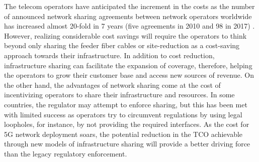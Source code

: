 
The telecom operators have anticipated the increment in the costs as the number of announced network sharing agreements between network operators worldwide has increased almost 20-fold in 7 years (five agreements in 2010 and 98 in 2017) \cite{mckinsey}. However, realizing considerable cost savings will require the operators to think beyond only sharing the feeder fiber cables or site-reduction \cite{5185100} as a cost-saving approach towards their infrastructure. In addition to cost reduction, infrastructure sharing can facilitate the expansion of coverage, therefore, helping the operators to grow their customer base and access new sources of revenue.
On the other hand, the advantages of network sharing come at the cost of incentivizing operators to share their infrastructure and resources. In some countries, the regulator may attempt to enforce sharing, but this has been met with limited success as operators try to circumvent regulations by using legal loopholes, for instance, by not providing the required interfaces. As the cost for \ac{5G} network deployment soars, the potential reduction in the \ac{TCO} achievable through new models of infrastructure sharing will provide a better driving force than the legacy regulatory enforcement.

